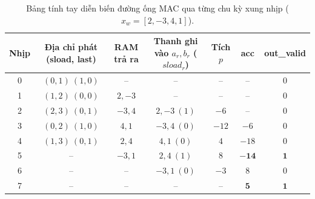 \begin{table}[H]
\centering
\caption{Bảng tính tay diễn biến đường ống MAC qua từng chu kỳ xung nhịp ($x_w = [2, -3, 4, 1]$).}
\label{tab:ch07_hand_trace}
\small
\begin{tabular}{ccccccc}
\toprule
\textbf{Nhịp} & \textbf{Địa chỉ phát (sload, last)} & \textbf{RAM trả ra} & \textbf{Thanh ghi vào $a_r, b_r$ ($sload_r$)} & \textbf{Tích $p$} & \textbf{acc} & \textbf{out\_valid} \\
\midrule
0 & $(0,1)\ (1, 0)$ & – & – & – & – & 0 \\
1 & $(1,2)\ (0, 0)$ & $2, -3$ & – & – & – & 0 \\
2 & $(2,3)\ (0, 1)$ & $-3, 4$ & $2, -3\ (1)$ & $-6$ & – & 0 \\
3 & $(0,2)\ (1, 0)$ & $4, 1$ & $-3, 4\ (0)$ & $-12$ & $-6$ & 0 \\
4 & $(1,3)\ (0, 1)$ & $2, 4$ & $4, 1\ (0)$ & $4$ & $-18$ & 0 \\
5 & – & $-3, 1$ & $2, 4\ (1)$ & $8$ & $\mathbf{-14}$ & $\mathbf{1}$ \\
6 & – & – & $-3, 1\ (0)$ & $-3$ & $8$ & 0 \\
7 & – & – & – & – & $\mathbf{5}$ & $\mathbf{1}$ \\
\bottomrule
\end{tabular}
\end{table}

